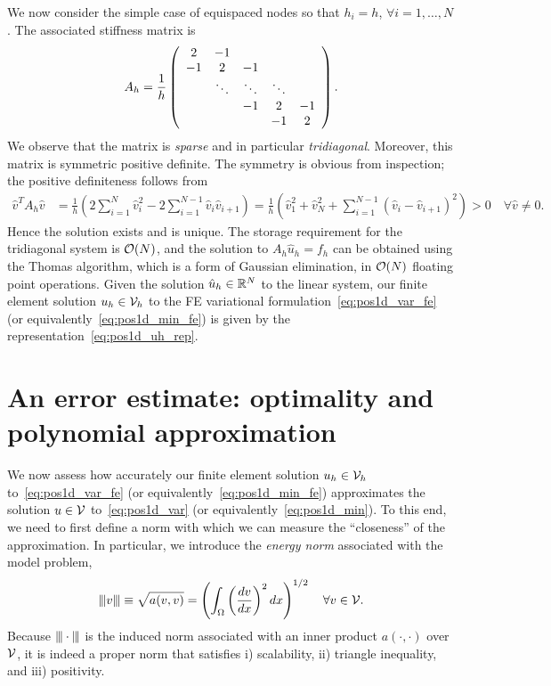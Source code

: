 We now consider the simple case of equispaced nodes so that $h_i = h$, $\forall i = 1,\dots,N$.  The associated stiffness matrix is
\begin{equation*}
  A_h = \frac{1}{h} \bmat{ccccc} 2 & -1 \\ -1 & 2 & -1 \\ & \ddots & \ddots & \ddots \\ & &-1 & 2 & -1 \\ &&& -1 & 2 \emat.
\end{equation*}
We observe that the matrix is \emph{sparse} and in particular \emph{tridiagonal}.  Moreover, this matrix is symmetric positive definite.  The symmetry is obvious from inspection; the positive definiteness follows from 
\begin{align*}
  \hat v^T A_h \hat v
  &=
  \frac{1}{h} \left(
  2\sum_{i=1}^N \hat v_i^2 - 2\sum_{i=1}^{N-1} \hat v_i\hat v_{i+1} 
  \right)
  =
  \frac{1}{h} \left(
  \hat v_1^2 + \hat v_{N}^2 + \sum_{i=1}^{N-1} (\hat v_i - \hat v_{i+1})^2 
  \right)
  > 0 \quad \forall \hat v \neq 0.
\end{align*}
Hence the solution exists and is unique.  The storage requirement for the tridiagonal system is $\calO(N)$, and the solution to $A_h \hat u_h = f_h$ can be obtained using the Thomas algorithm, which is a form of Gaussian elimination, in $\calO(N)$ floating point operations.  Given the solution  $\hat u_h \in \RR^N$ to the linear system, our finite element solution $u_h \in \calV_h$ to the FE variational formulation~\eqref{eq:pos1d_var_fe} (or equivalently~\eqref{eq:pos1d_min_fe}) is given by the representation~\eqref{eq:pos1d_uh_rep}.

\section{An error estimate: optimality and polynomial approximation}
We now assess how accurately our finite element solution $u_h \in \calV_h$ to~\eqref{eq:pos1d_var_fe} (or equivalently~\eqref{eq:pos1d_min_fe}) approximates the solution $u \in \calV$ to~\eqref{eq:pos1d_var} (or equivalently~\eqref{eq:pos1d_min}).  To this end, we need to first define a norm with which we can measure the ``closeness'' of the approximation. In particular, we introduce the \emph{energy norm} associated with the model problem,
\begin{equation*}
  \enorm{v} \equiv \sqrt{a(v,v)}  = \left( \int_{\Omega} \left( \dd{v}{x} \right)^2 dx \right)^{1/2} \quad \forall v \in \calV.
\end{equation*}
Because $\enorm{ \cdot }$ is the induced norm associated with an inner product $a(\cdot,\cdot)$ over $\calV$, it is indeed a proper norm that satisfies i) scalability, ii) triangle inequality, and iii) positivity.  

